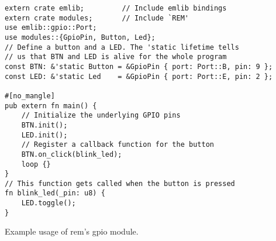 \begin{listing}[H]
  \begin{verbatim}
extern crate emlib;         // Include emlib bindings
extern crate modules;       // Include `REM'
use emlib::gpio::Port;
use modules::{GpioPin, Button, Led};
// Define a button and a LED. The 'static lifetime tells
// us that BTN and LED is alive for the whole program
const BTN: &'static Button = &GpioPin { port: Port::B, pin: 9 };
const LED: &'static Led    = &GpioPin { port: Port::E, pin: 2 };

#[no_mangle]
pub extern fn main() {
    // Initialize the underlying GPIO pins
    BTN.init();
    LED.init();
    // Register a callback function for the button
    BTN.on_click(blink_led);
    loop {}
}
// This function gets called when the button is pressed
fn blink_led(_pin: u8) {
    LED.toggle();
}
  \end{verbatim}
  \caption{Example usage of \gls{rem}'s \gls{gpio} module.}
  \label{lst:gpio_abstraction}
\end{listing}
